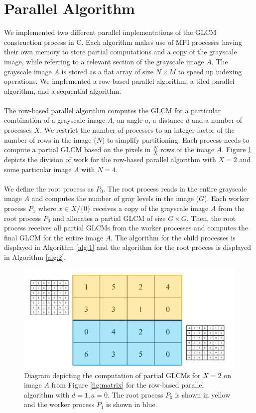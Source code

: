 \documentclass{article}
\begin{document}
\section{Parallel Algorithm}
    We implemented two different parallel implementations of the GLCM construction process in C. Each algorithm makes use of MPI processes having their own memory to store partial computations and a copy of the grayscale image, while referring to a relevant section of the grayscale image $A$. The grayscale image $A$ is stored as a flat array of size $N \times M$ to speed up indexing operations. We implemented a row-based parallel algorithm, a tiled parallel algorithm, and a sequential algorithm. \\ \\ 
    The row-based parallel algorithm computes the GLCM for a particular combination of a grayscale image $A$, an angle $a$, a distance $d$ and a number of processes $X$. We restrict the number of processes to an integer factor of the number of rows in the image ($N$) to simplify partitioning. Each process needs to compute a partial GLCM based on the pixels in $\frac{N}{X}$ rows of the image $A$. Figure \ref{fig:rows} depicts the division of work for the row-based parallel algorithm with $X = 2$ and some particular image $A$ with $N = 4$. \\ \\ 
    We define the root process as $P_0$. The root process reads in the entire grayscale image $A$ and computes the number of gray levels in the image ($G$). Each worker process $P_x$ where $x \in X / \{0\}$ receives a copy of the grayscale image $A$ from the root process $P_0$ and allocates a partial GLCM of size $G \times G$. Then, the root process receives all partial GLCMs from the worker processes and computes the final GLCM for the entire image $A$. The algorithm for the child processes is displayed in Algorithm \ref{alg:1} and the algorithm for the root process is displayed in Algorithm \ref{alg:2}.
    \begin{figure}
      \includegraphics[width=\linewidth]{row_partitioning.jpg}
      \caption{Diagram depicting the computation of partial GLCMs for $X = 2$ on image $A$ from Figure \ref{fig:matrix} for the row-based parallel algorithm with $d = 1, a = 0$. The root process $P_0$ is shown in yellow and the worker process $P_1$ is shown in blue. }
      \label{fig:rows}
    \end{figure}
\end{document}
